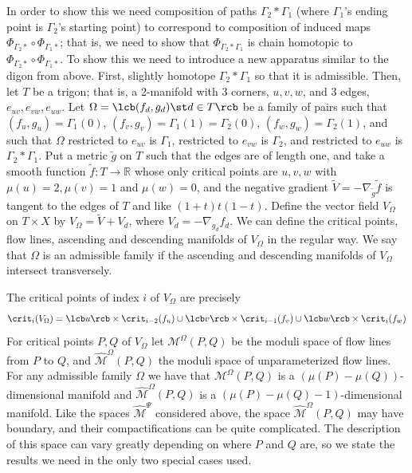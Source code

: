 In order to show this we need composition of paths $\Gamma_2 * \Gamma_1$ (where $\Gamma_1$'s ending point is $\Gamma_2$'s starting point) to correspond to composition of induced maps $\Phi_{\Gamma_2*} \circ \Phi_{\Gamma_1*}$; that is, we need to show that $\Phi_{\Gamma_2*\Gamma_1}$ is chain homotopic to $\Phi_{\Gamma_2*} \circ \Phi_{\Gamma_1*}$. To show this we need to introduce a new apparatus similar to the digon from above. First, slightly homotope $\Gamma_2 * \Gamma_1$ so that it is admissible. Then, let $T$ be a trigon; that is, a 2-manifold with 3 corners, $u,v,w$, and 3 edges, $e_{uv},e_{vw},e_{uw}$. Let $\Omega = \lcb (f_d,g_d) \st d \in T \rcb$ be a family of pairs such that $(f_u,g_u)=\Gamma_1(0)$, $(f_v,g_v)=\Gamma_1(1)=\Gamma_2(0)$, $(f_w,g_w)=\Gamma_2(1)$, and such that $\Omega$ restricted to $e_{uv}$ is $\Gamma_1$, restricted to $e_{vw}$ is $\Gamma_2$, and restricted to $e_{uw}$ is $\Gamma_2 * \Gamma_1$. Put a metric $\widetilde g$ on $T$ such that the edges are of length one, and take a smooth function $\widetilde f : T \rightarrow \mathbb R$ whose only critical points are $u,v,w$ with $\mu(u)=2,\mu(v)=1$ and $\mu(w)=0$, and the negative gradient $\widetilde V=-\nabla_{\widetilde g} \widetilde f$ is tangent to the edges of $T$ and like $(1+t)t(1-t)$. Define the vector field $V_\Omega$ on $T \times X$ by $V_\Omega = \widetilde V + V_d$, where $V_d = -\nabla_{g_d} f_d$. We can define the critical points, flow lines, ascending and descending manifolds of $V_\Omega$ in the regular way. We say that $\Omega$ is an admissible family if the ascending and descending manifolds of $V_\Omega$ intersect transversely.

The critical points of index $i$ of $V_\Omega$ are precisely
\[ \crit_i(V_\Omega) = \lcb u \rcb \times \crit_{i-2}(f_u) \cup \lcb v \rcb \times \crit_{i-1}(f_v) \cup \lcb w \rcb \times \crit_i(f_w) \]
For critical points $P,Q$ of $V_\Omega$ let $\mathcal M^\Omega(P,Q)$ be the moduli space of flow lines from $P$ to $Q$, and $\widehat{\mathcal M}^\Omega(P,Q)$ the moduli space of unparameterized flow lines. For any admissible family $\Omega$ we have that $\mathcal M^\Omega(P,Q)$ is a $(\mu(P)-\mu(Q))$-dimensional manifold and $\widehat{\mathcal M}^\Omega(P,Q)$ is a $(\mu(P)-\mu(Q)-1)$-dimensional manifold. Like the spaces $\widehat{\mathcal M}^\Psi$ considered above, the space $\widehat{\mathcal M}^\Omega(P,Q)$ may have boundary, and their compactifications can be quite complicated. The description of this space can vary greatly depending on where $P$ and $Q$ are, so we state the results we need in the only two special cases used.

